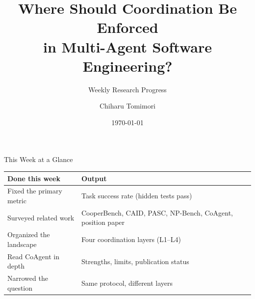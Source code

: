 \documentclass[aspectratio=169,11pt]{beamer}
\title[Where to Enforce Coordination]{Where Should Coordination Be Enforced\\in Multi-Agent Software Engineering?}
\subtitle{Weekly Research Progress}
\author{Chiharu Tomimori}
\institute{Institute of Science Tokyo}
\date{\today}
\begin{document}
\begin{frame}
  \titlepage
\end{frame}

\begin{frame}{This Week at a Glance}
  \centering

  \vspace{1.2em}
  \small
  \begin{tabular}{ll}
    \toprule
    Done this week & Output \\
    \midrule
    Fixed the primary metric & Task success rate (hidden tests pass) \\
    Surveyed related work & CooperBench, CAID, PASC, NP-Bench, CoAgent, position paper \\
    Organized the landscape & Four coordination layers (L1--L4) \\
    Read CoAgent in depth & Strengths, limits, publication status \\
    Narrowed the question & Same protocol, different layers \\
    \bottomrule
  \end{tabular}
\end{frame}

\end{document}
